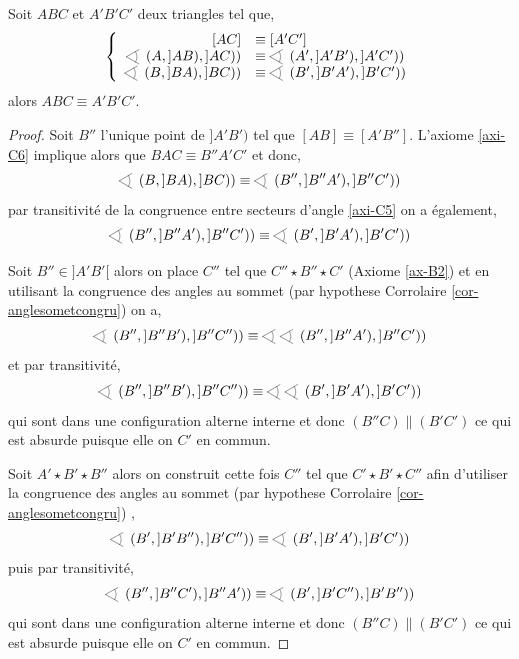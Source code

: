 \begin{lem}\label{lem-congrutriang}
    Soit $ABC$ et $A'B'C'$ deux triangles tel que,
    \begin{equation*}
        \left\{
        \begin{array}{rl}
             [AC]&\equiv [A'C']  \\
             \anglesaillant \left(A,]AB),]AC)\right)&\equiv \anglesaillant \left(A',]A'B'),]A'C')\right) \\
             \anglesaillant \left(B,]BA),]BC)\right)&\equiv \anglesaillant \left(B',]B'A'),]B'C')\right)
        \end{array}
        \right.
    \end{equation*}
    alors $ABC\equiv A'B'C'$.
\begin{proof}
    Soit $B''$ l'unique point de $]A'B')$ tel que $[AB]\equiv [A'B'']$. L'axiome \ref{axi-C6} implique alors que $BAC \equiv B'' A' C'$ et donc,
    \begin{equation*}
        \anglesaillant \left(B,]BA),]BC)\right) \equiv \anglesaillant \left(B'',]B''A'),]B''C')\right)
    \end{equation*}
    par transitivité de la congruence entre secteurs d'angle \ref{axi-C5} on a également,
    \begin{equation*}
        \anglesaillant \left(B'',]B''A'),]B''C')\right) \equiv \anglesaillant \left(B',]B'A'),]B'C')\right)
    \end{equation*}  

    Soit $B'' \in ]A'B'[$ alors on place $C''$ tel que $C'' \star B'' \star C'$ (Axiome \ref{ax-B2}) et en utilisant la congruence des angles au sommet (par hypothese Corrolaire \ref{cor-anglesometcongru}) on a,
    \begin{equation*}
        \anglesaillant \left(B'',]B''B'),]B''C'')\right) \equiv \anglesaillant \anglesaillant \left(B'',]B''A'),]B''C')\right)
    \end{equation*}
    et par transitivité,
    \begin{equation*}
        \anglesaillant \left(B'',]B''B'),]B''C'')\right) \equiv \anglesaillant \anglesaillant \left(B',]B'A'),]B'C')\right)
    \end{equation*}    
    qui sont dans une configuration alterne interne et donc $(B'' C)\| (B'C')$ ce qui est absurde puisque elle on $C'$ en commun.  
    
    Soit $A'\star B'\star B''$ alors on construit cette fois $C''$ tel que $C'\star B'\star C''$ afin d'utiliser la congruence des angles au sommet (par hypothese Corrolaire \ref{cor-anglesometcongru}) ,
    \begin{equation*}
        \anglesaillant \left(B',]B'B''),]B'C'')\right) \equiv \anglesaillant \left(B',]B'A'),]B'C')\right)
    \end{equation*}
    puis par transitivité,
    \begin{equation*}
        \anglesaillant \left(B'',]B''C'),]B''A')\right) \equiv  \anglesaillant \left(B',]B'C''),]B'B'')\right)
    \end{equation*}   
    qui sont dans une configuration alterne interne et donc $(B'' C)\| (B'C')$ ce qui est absurde puisque elle on $C'$ en commun. 
\end{proof}
\end{lem}
